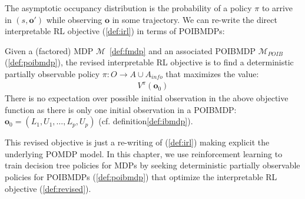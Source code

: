 The asymptotic occupancy distribution is the probability of a policy $\pi$ to arrive in $(s,\boldsymbol{o}')$ while observing $\boldsymbol{o}$ in some trajectory.  
We can re-write the direct interpretable RL objective (\ref{def:irl}) in terms of POIBMDPs:

\begin{definition}\label{def:revised}
    Given a (factored) MDP $\mathcal{M}$~\ref{def:fmdp} and an associated POIBMDP $\mathcal{M}_{POIB}$ (\ref{def:poibmdp}), the revised interpretable RL objective is to find a deterministic partially observable policy $\pi:O\rightarrow A\cup A_{info}$ that maximizes the value:
\begin{align}
    V^{\pi}(\boldsymbol{o}_0)
\end{align}
There is no expectation over possible initial observation in the above objective function as there is only one initial observation in a POIBMDP: $\boldsymbol{o}_0=(L_1, U_1, \dots, L_p, U_p)$ (cf. definition\ref{def:ibmdp}).
\end{definition}
This revised objective is just a re-writing of (\ref{def:irl}) making explicit the underlying POMDP model.
In this chapter, we use reinforcement learning to train decision tree policies for MDPs by seeking deterministic partially observable policies for POIBMDPs (\ref{def:poibmdp}) that optimize the interpretable RL objective (\ref{def:revised}).

    
    
    
